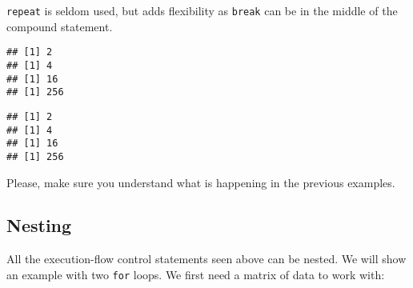 \documentclass[paper=a4,headsepline,BCOR=12mm,twoside,open=right,%
titlepage,headings=small,fontsize=10pt,index=totoc,bibliography=totoc,%
captions=tableheading,captions=nooneline]{scrbook}\usepackage{knitr}
\begin{document}
\texttt{repeat} is seldom used, but adds flexibility as \texttt{break} can be in the middle of the compound statement.

\begin{knitrout}\footnotesize
{}\color{fgcolor}\begin{kframe}
\begin{alltt}
 \hlkwb{<-} 
\hlstd{\{}
   \hlkwb{<-} \hlopt{^}
    \hlopt{>} \hlstd{) \{} \hlstd{()\}}
\hlstd{\}}
\end{alltt}
\begin{verbatim}
## [1] 2
## [1] 4
## [1] 16
## [1] 256
\end{verbatim}
\begin{alltt}
 \hlkwb{<-} 
\hlstd{\{}
    \hlopt{>} \hlstd{)} \hlstd{()}
   \hlkwb{<-} \hlopt{^}
\hlstd{\}}
\end{alltt}
\begin{verbatim}
## [1] 2
## [1] 4
## [1] 16
## [1] 256
\end{verbatim}
\end{kframe}
\end{knitrout}

Please, make sure you understand what is happening in the previous examples.

\subsection{Nesting}

All the execution-flow control statements seen above can be nested. We will show an example with two \texttt{for} loops. We first need a matrix of data to work with:
\end{document}

